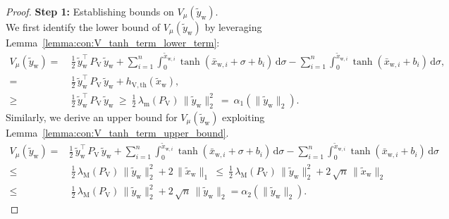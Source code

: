 \begin{proof}
    \textbf{Step 1:} Establishing bounds on $V_\mu(\tilde{y}_\mathrm{w})$.\\
    We first identify the lower bound of $V_\mu(\tilde{y}_\mathrm{w})$ by leveraging Lemma~\ref{lemma:con:V_tanh_term_lower_term}:
    \begin{equation}
    \begin{split}
        V_\mu(\tilde{y}_\mathrm{w}) =& \: \frac{1}{2} \, \tilde{y}_\mathrm{w}^\top \, P_\mathrm{V} \, \tilde{y}_\mathrm{w} + \sum_{i=1}^n \int_{0}^{\tilde{x}_{\mathrm{w},i}} \tanh(\bar{x}_{\mathrm{w},i}+\sigma+b_i) \, \mathrm{d} \sigma - \sum_{i=1}^n \int_{0}^{\tilde{x}_{\mathrm{w},i}} \tanh(\bar{x}_{\mathrm{w},i}+b_i) \, \mathrm{d} \sigma,\\
        =& \: \frac{1}{2} \, \tilde{y}_\mathrm{w}^\top \, P_\mathrm{V} \, \tilde{y}_\mathrm{w} + h_{\mathrm{V},\mathrm{th}}(\tilde{x}_\mathrm{w}),\\
        \geq& \: \frac{1}{2} \, \tilde{y}_\mathrm{w}^\top \, P_\mathrm{V} \, \tilde{y}_\mathrm{w}
        \: \geq \: \frac{1}{2} \, \lambda_\mathrm{m}(P_\mathrm{V}) \, \lVert \tilde{y}_\mathrm{w} \rVert_2^2
        \: = \: \alpha_1(\lVert \tilde{y}_\mathrm{w} \rVert_2).
    \end{split}
    \end{equation}
    Similarly, we derive an upper bound for $V_\mu(\tilde{y}_\mathrm{w})$ exploiting Lemma~\ref{lemma:con:V_tanh_term_upper_bound}.
    \begin{equation}
    \begin{split}
        V_\mu(\tilde{y}_\mathrm{w}) =& \frac{1}{2} \, \tilde{y}_\mathrm{w}^\top \, P_\mathrm{V} \, \tilde{y}_\mathrm{w} + \sum_{i=1}^n \int_{0}^{\tilde{x}_{\mathrm{w},i}} \tanh(\bar{x}_{\mathrm{w},i}+\sigma+b_i) \, \mathrm{d} \sigma - \sum_{i=1}^n \int_{0}^{\tilde{x}_{\mathrm{w},i}} \tanh(\bar{x}_{\mathrm{w},i}+b_i) \, \mathrm{d} \sigma\\
        \leq& \: \frac{1}{2} \, \lambda_\mathrm{M}(P_\mathrm{V}) \, \lVert \tilde{y}_\mathrm{w} \rVert_2^2 + 2 \, \lVert\tilde{x}_\mathrm{w}\rVert_1
        \: \leq \: \frac{1}{2} \, \lambda_\mathrm{M}(P_\mathrm{V}) \, \lVert \tilde{y}_\mathrm{w} \rVert_2^2 + 2 \, \sqrt{n} \, \lVert\tilde{x}_\mathrm{w}\rVert_2\\
        \leq& \: \frac{1}{2} \, \lambda_\mathrm{M}(P_\mathrm{V}) \, \lVert \tilde{y}_\mathrm{w} \rVert_2^2 + 2 \, \sqrt{n} \, \lVert\tilde{y}_\mathrm{w}\rVert_2 = \alpha_2(\lVert\tilde{y}_\mathrm{w}\rVert_2).
    \end{split}
    \end{equation}


\end{proof}
